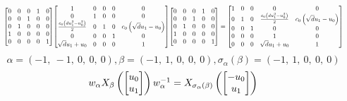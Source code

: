 \documentclass[11pt]{article}
\theoremstyle{definition}
\begin{document}
\[
\scaletoalign{\textwidth}{{\left[\begin{matrix}0 & 0 & 0 & 1 & 0\\0 & 0 & 1 & 0 & 0\\0 & 1 & 0 & 0 & 0\\1 & 0 & 0 & 0 & 0\\0 & 0 & 0 & 0 & 1\end{matrix}\right]} {\left[\begin{matrix}1 & 0 & 0 & 0 & 0\\0 & 1 & 0 & 0 & 0\\\frac{c_{0} \left(d u_{1}^{2} - u_{0}^{2}\right)}{2} & 0 & 1 & 0 & c_{0} \left(\sqrt{d} u_{1} - u_{0}\right)\\0 & 0 & 0 & 1 & 0\\\sqrt{d} u_{1} + u_{0} & 0 & 0 & 0 & 1\end{matrix}\right]} {\left[\begin{matrix}0 & 0 & 0 & 1 & 0\\0 & 0 & 1 & 0 & 0\\0 & 1 & 0 & 0 & 0\\1 & 0 & 0 & 0 & 0\\0 & 0 & 0 & 0 & 1\end{matrix}\right]} = {\left[\begin{matrix}1 & 0 & 0 & 0 & 0\\0 & 1 & 0 & \frac{c_{0} \left(d u_{1}^{2} - u_{0}^{2}\right)}{2} & c_{0} \left(\sqrt{d} u_{1} - u_{0}\right)\\0 & 0 & 1 & 0 & 0\\0 & 0 & 0 & 1 & 0\\0 & 0 & 0 & \sqrt{d} u_{1} + u_{0} & 1\end{matrix}\right]}}
\]
\[
\alpha = \left( -1, \  -1, \  0, \  0, \  0\right), \beta = \left( -1, \  1, \  0, \  0, \  0\right), \sigma_{\alpha}(\beta) = \left( -1, \  1, \  0, \  0, \  0\right)
\]
\[
\scaletoalign{\textwidth}{w_{\alpha} X_{\beta}\left(\left[\begin{matrix}u_{0}\\u_{1}\end{matrix}\right]\right) w_{\alpha}^{-1} = X_{\sigma_{\alpha}\left(\beta\right)}\left(\left[\begin{matrix}- u_{0}\\u_{1}\end{matrix}\right]\right)}
\]
\end{document}
